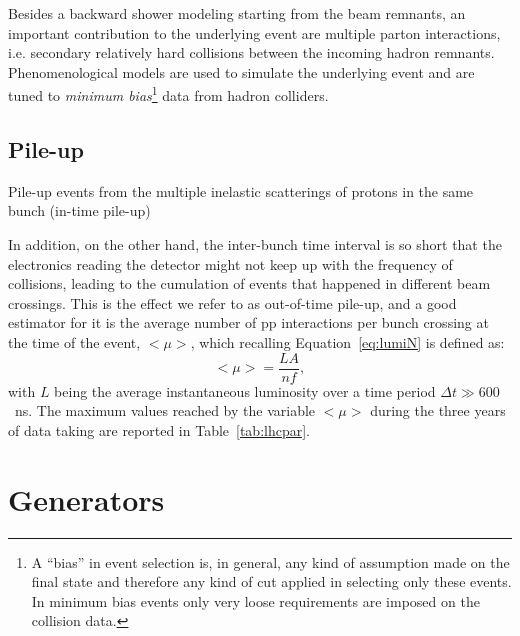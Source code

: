 Besides a backward shower modeling starting from the beam remnants, an
important contribution to the underlying event are multiple parton interactions,
i.e. secondary relatively hard collisions between the incoming hadron remnants.
Phenomenological models are used to simulate the underlying event
and are tuned to {\it minimum bias}\footnote{A ``bias'' in event selection
is, in general, any kind of assumption made on the final state and therefore
any kind of cut applied in selecting only these events. In minimum bias events
only very loose requirements are imposed on the collision data.} %
data from hadron colliders. 


\subsection{Pile-up}\label{sec:MCpileup}

Pile-up events from the multiple inelastic scatterings of protons 
in the same bunch (in-time pile-up) 


In addition, on the other hand, the inter-bunch time interval is so short
that the electronics reading the detector might not keep up with the frequency of collisions, leading to the
cumulation of events that happened in different beam crossings. This is the effect we refer to as 
out-of-time pile-up, and a good estimator for it is the average number of pp interactions
per bunch crossing at the time of the event, $<\mu>$, which recalling Equation~\ref{eq:lumiN} is defined as:
\begin{equation}\label{eq:mu}
<\mu> = \dfrac{LA}{nf},
\end{equation}
with $L$ being the average instantaneous luminosity over a time period $\Delta t\gg 600$~ns.
The maximum values reached by the variable $<\mu>$ during the three years of data taking
are reported in Table~\ref{tab:lhcpar}.
~\cite{Buckley:2011vq,Cacciari:2007fd}




\section{Generators}\label{sec:generators}

